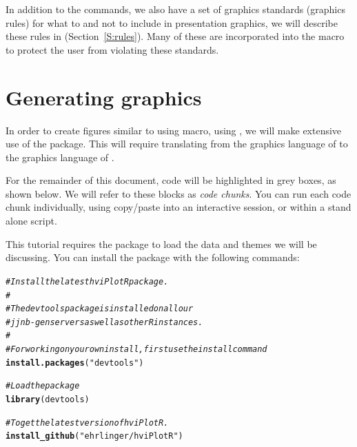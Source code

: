 \documentclass[nojss, letterpaper]{jss}\usepackage[]{graphicx}\usepackage[]{color}
\makeatletter
\newcommand{\hlstr}[1]{\textcolor[rgb]{0.192,0.494,0.8}{#1}}%
\newcommand{\hlcom}[1]{\textcolor[rgb]{0.678,0.584,0.686}{\textit{#1}}}%
\newcommand{\hlstd}[1]{\textcolor[rgb]{0.345,0.345,0.345}{#1}}%
\newcommand{\hlkwd}[1]{\textcolor[rgb]{0.737,0.353,0.396}{\textbf{#1}}}%
\newenvironment{kframe}{%
 \def\at@end@of@kframe{}%
 \ifinner\ifhmode%
  \def\at@end@of@kframe{\end{minipage}}%
  \begin{minipage}{\columnwidth}%
 \fi\fi%
 \def\FrameCommand##1{\hskip\@totalleftmargin \hskip-\fboxsep
 \colorbox{shadecolor}{##1}\hskip-\fboxsep
     \hskip-\linewidth \hskip-\@totalleftmargin \hskip\columnwidth}%
 \MakeFramed {\advance\hsize-\width
   \@totalleftmargin\z@ \linewidth\hsize
   \@setminipage}}%
 {\par\unskip\endMakeFramed%
 \at@end@of@kframe}
\newenvironment{knitrout}{}{} %
\makeatother
\begin{document}
In addition to the  commands, we also have a set of graphics standards (graphics rules) for what to and not to include in presentation graphics, we will describe these rules in (Section~\ref{S:rules}). Many of these are incorporated into the  macro to protect the user from violating these standards.

\section[Generating ggplot2 graphics]{Generating  graphics}\label{S:ggplot2tuple}

In order to create figures similar to using  macro, using , we will make extensive use of the  package. This will require translating from the graphics language of  to the graphics language of . 

For the remainder of this document,  code will be highlighted in grey boxes, as shown below. We will refer to these blocks as \emph{code chunks}. You can run each code chunk individually, using copy/paste into an interactive  session, or within a stand alone  script.

This tutorial requires the  package to load the data and themes we will be discussing. You can install the package with the following commands:
\begin{knitrout}\footnotesize
{}\color{fgcolor}\begin{kframe}
\begin{alltt}
\hlcom{# Install the latest hviPlotR package.}
\hlcom{#}
\hlcom{# The devtools package is installed on all our }
\hlcom{# jjnb-gen servers as well as other R instances.}
\hlcom{#}
\hlcom{# For working on your own install, first use the install command}
\hlkwd{install.packages}\hlstd{(}\hlstr{"devtools"}\hlstd{)}

\hlcom{# Load the package}
\hlkwd{library}\hlstd{(devtools)}

\hlcom{# To get the latest version of hviPlotR.}
\hlkwd{install_github}\hlstd{(}\hlstr{"ehrlinger/hviPlotR"}\hlstd{)}
\end{alltt}
\end{kframe}
\end{knitrout}
\end{document}
